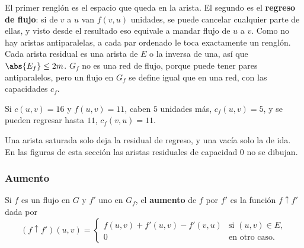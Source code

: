 \documentclass[11pt,letterpaper]{article}
\begin{document}
El primer renglón es el espacio que queda en la arista. El segundo es
el \textbf{regreso de flujo}: si de $v$ a $u$ van $f(v, u)$ unidades,
se puede cancelar cualquier parte de ellas, y visto desde el resultado
eso equivale a mandar flujo de $u$ a $v$. Como no hay aristas
antiparalelas, a cada par ordenado le toca exactamente un renglón.
Cada arista residual es una arista de $E$ o la inversa de una, así que
$\abs{E_f} \le 2m$. $G_f$ no es una red de flujo, porque puede tener
pares antiparalelos, pero un flujo en $G_f$ se define igual que en una
red, con las capacidades $c_f$.

\begin{ejemplo}\label{ej:flujo-arista}
  Si $c(u, v) = 16$ y $f(u, v) = 11$, caben $5$ unidades más,
  $c_f(u, v) = 5$, y se pueden regresar hasta $11$, $c_f(v, u) = 11$.
  \begin{center}
  \hspace{1.5cm}
  \end{center}
  Una arista saturada solo deja la residual de regreso, y una vacía
  solo la de ida. En las figuras de esta sección las aristas
  residuales de capacidad $0$ no se dibujan.
\end{ejemplo}

\subsubsection*{Aumento}

\begin{definicion}[Aumento]
  Si $f$ es un flujo en $G$ y $f'$ uno en $G_f$, el \textbf{aumento}
  de $f$ por $f'$ es la función $f \uparrow f'$ dada por
  \[
    (f \uparrow f')(u, v) =
    \begin{cases}
      f(u, v) + f'(u, v) - f'(v, u) & \text{si } (u, v) \in E , \\
      0 & \text{en otro caso.}
    \end{cases}
  \]
\end{definicion}
\end{document}
